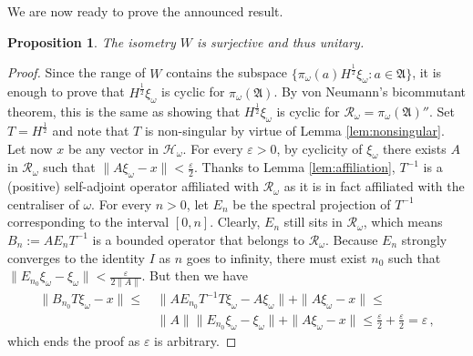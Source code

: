 \documentclass[12pt]{amsart}
\numberwithin{equation}{section}
\def\ch{{\mathcal H}}
\def\ga{{\mathfrak A}} \def\gpa{{\mathfrak a}}
\def\om{\omega} \def\Om{\Omega}
\newtheorem{prop}[thm]{Proposition}
\theoremstyle{definition}
\begin{document}
We are now ready to prove the announced result.
\begin{prop}
\label{prop:isom}
The isometry $W$ is surjective and thus unitary. 
\end{prop}

\begin{proof}
Since the range of $W$ contains the subspace $\{\pi_\om(a) H^\frac{1}{2}\xi_\om: a\in\ga\}$, it is enough
to prove that $H^\frac{1}{2}\xi_\om$ is cyclic for $\pi_\om(\ga)$. By von Neumann's bicommutant theorem, this is the same as 
showing that  $H^\frac{ 1}{2}\xi_\om$ is cyclic for $\mathcal{R}_\om= \pi_\om(\ga)''$. Set $T=H^\frac{1}{2}$ and note 
that $T$ is non-singular by virtue of Lemma \ref{lem:nonsingular}.\\
Let now $x$ be any vector in $\ch_\om$. For every $\varepsilon >0$, by cyclicity of
$\xi_\om$ there exists
$A$ in $\mathcal{R}_\om$ such that $\|A\xi_\om- x \|<\frac{\varepsilon}{2}$.
Thanks to Lemma \ref{lem:affiliation}, $T^{-1}$ is a (positive) self-adjoint operator affiliated with $\mathcal{R}_\om$ as it is in fact affiliated with the centraliser of $\om$. For every $n>0$, let $E_n$ be the spectral
projection of $T^{-1}$ corresponding to the interval $[0, n]$. Clearly, $E_n$ still sits in 
$\mathcal{R}_\om$, which means $B_n:=AE_nT^{-1}$ is a bounded operator that belongs to $\mathcal{R}_\om$.
Because $E_n$ strongly converges to the identity $I$ as $n$ goes to infinity, there must exist $n_0$ such that
$\|E_{n_0}\xi_\om- \xi_\om\|<\frac{\varepsilon}{2\|A\|}$.
But then we have
\begin{align*}
\|B_{n_0}T\xi_\om- x\|\leq&\,\|AE_{n_0}T^{-1}T\xi_\om- A\xi_\om\|+\|A\xi_\om-x\| \leq\\
 &\,\|A\|\|E_{n_0}\xi_\om- \xi_\om\|+\|A\xi_\om-x\| \leq \frac{\varepsilon}{2}+\frac{\varepsilon}{2}=\varepsilon\,,
\end{align*}
which ends the proof as  $\varepsilon$ is arbitrary.
\end{proof}
\end{document}
